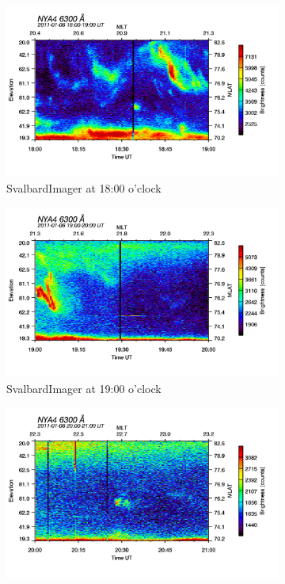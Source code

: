 \documentclass[10pt,a4paper]{article}
\begin{document}
\begin{figure}[h]
\centering
\begin{subfigure}{0.3\textwidth}
\centering
	\includegraphics[width=\textwidth]{SvalbardImager6300A18.png}
	\caption{ SvalbardImager at 18:00 o'clock \label{SBI_6_18}}
\end{subfigure}
\begin{subfigure}{0.3\textwidth}
\centering
	\includegraphics[width=\textwidth]{SvalbardImager6300A19.png}
	\caption{ SvalbardImager at 19:00 o'clock \label{SBI_6_19}}
\end{subfigure}
\begin{subfigure}{0.3\textwidth}
\centering
	\includegraphics[width=\textwidth]{SvalbardImager6300A20.png}

\end{subfigure}
\end{figure}
\end{document}
